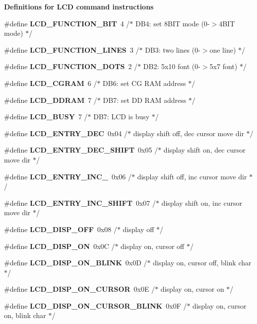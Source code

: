\begin{Indent}{\bf Definitions for L\+CD command instructions}
\begin{DoxyCompactItemize}
\#define {\bfseries L\+C\+D\+\_\+\+F\+U\+N\+C\+T\+I\+O\+N\+\_\+B\+IT}~4 /$\ast$   D\+B4\+: set 8\+B\+I\+T mode (0-\/$>$4\+B\+I\+T mode) $\ast$/
\item 
\#define {\bfseries L\+C\+D\+\_\+\+F\+U\+N\+C\+T\+I\+O\+N\+\_\+L\+I\+N\+ES}~3 /$\ast$   D\+B3\+: two lines (0-\/$>$one line)      $\ast$/
\item 
\#define {\bfseries L\+C\+D\+\_\+\+F\+U\+N\+C\+T\+I\+O\+N\+\_\+D\+O\+TS}~2 /$\ast$   D\+B2\+: 5x10 font (0-\/$>$5x7 font)      $\ast$/
\item 
\#define {\bfseries L\+C\+D\+\_\+\+C\+G\+R\+AM}~6 /$\ast$ D\+B6\+: set CG R\+AM address             $\ast$/
\item 
\#define {\bfseries L\+C\+D\+\_\+\+D\+D\+R\+AM}~7 /$\ast$ D\+B7\+: set DD R\+AM address             $\ast$/
\item 
\#define {\bfseries L\+C\+D\+\_\+\+B\+U\+SY}~7 /$\ast$ D\+B7\+: L\+CD is busy                    $\ast$/
\item 
\#define {\bfseries L\+C\+D\+\_\+\+E\+N\+T\+R\+Y\+\_\+\+D\+EC}~0x04 /$\ast$ display shift off, dec cursor move dir $\ast$/
\item 
\#define {\bfseries L\+C\+D\+\_\+\+E\+N\+T\+R\+Y\+\_\+\+D\+E\+C\+\_\+\+S\+H\+I\+FT}~0x05 /$\ast$ display shift on,  dec cursor move dir $\ast$/
\item 
\#define {\bfseries L\+C\+D\+\_\+\+E\+N\+T\+R\+Y\+\_\+\+I\+N\+C\+\_\+}~0x06 /$\ast$ display shift off, inc cursor move dir $\ast$/
\item 
\#define {\bfseries L\+C\+D\+\_\+\+E\+N\+T\+R\+Y\+\_\+\+I\+N\+C\+\_\+\+S\+H\+I\+FT}~0x07 /$\ast$ display shift on,  inc cursor move dir $\ast$/
\item 
\#define {\bfseries L\+C\+D\+\_\+\+D\+I\+S\+P\+\_\+\+O\+FF}~0x08 /$\ast$ display off                            $\ast$/
\item 
\#define {\bfseries L\+C\+D\+\_\+\+D\+I\+S\+P\+\_\+\+ON}~0x0\+C /$\ast$ display on, cursor off                 $\ast$/
\item 
\#define {\bfseries L\+C\+D\+\_\+\+D\+I\+S\+P\+\_\+\+O\+N\+\_\+\+B\+L\+I\+NK}~0x0\+D /$\ast$ display on, cursor off, blink char     $\ast$/
\item 
\#define {\bfseries L\+C\+D\+\_\+\+D\+I\+S\+P\+\_\+\+O\+N\+\_\+\+C\+U\+R\+S\+OR}~0x0\+E /$\ast$ display on, cursor on                  $\ast$/
\item 
\#define {\bfseries L\+C\+D\+\_\+\+D\+I\+S\+P\+\_\+\+O\+N\+\_\+\+C\+U\+R\+S\+O\+R\+\_\+\+B\+L\+I\+NK}~0x0\+F /$\ast$ display on, cursor on, blink char      $\ast$/

\end{DoxyCompactItemize}
\end{Indent}

